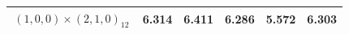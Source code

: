 \begin{enumerate}[label=\alph*.]
\begin{longtable}{|c|c|c|c|c|c|}
        $\,(1,0,0)\times(2,1,0)_{12}\,$ & 6.314 & 6.411 & 6.286 & 5.572 & 6.303 \\ \hline

        \end{longtable}
    
\end{enumerate}